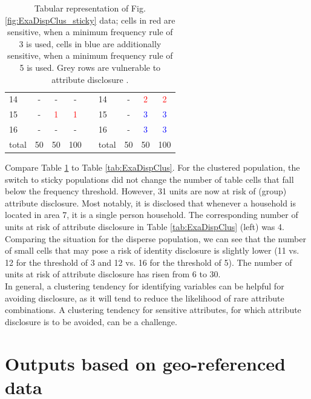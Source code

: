 \begin{table}[H]
\begin{tabular}{|l|cc|c|  c  |l|cc|c|}
        14 & -  & -  & -  &  & 14 & \cellcolor{lgrey}-  & \cellcolor{lgrey}\textcolor{red}{2} & \cellcolor{lgrey}\textcolor{red}{2}  \\
        15 & \cellcolor{lgrey}-  & \cellcolor{lgrey}\textcolor{red}{1}  & \cellcolor{lgrey}\textcolor{red}{1}  &  & 15 & \cellcolor{lgrey}-  & \cellcolor{lgrey}\textcolor{blue}{3} & \cellcolor{lgrey}\textcolor{blue}{3}  \\
        16 & -  & -  & -  &  & 16 & \cellcolor{lgrey}-  & \cellcolor{lgrey}\textcolor{blue}{3} & \cellcolor{lgrey}\textcolor{blue}{3}  \\
        \cline{1-4} \cline{6-9}
        \cline{1-4} \cline{6-9}
        total & 50 & 50 & 100 & & total & 50 & 50 & 100\\ 
        \cline{1-4} \cline{6-9}
    \end{tabular}
    \caption{Tabular representation of Fig. \ref{fig:ExaDispClus_sticky} data; cells in red are sensitive, when a minimum frequency rule of 3 is used, cells in blue are additionally sensitive, when a minimum frequency rule of 5 is used. Grey rows are vulnerable to attribute disclosure \citep[5.2]{HundepoolEtAl2024}.}
    \label{tab:ExaDispClus_sticky}
\end{table}

Compare Table \ref{tab:ExaDispClus_sticky} to Table \ref{tab:ExaDispClus}. For the clustered population, the switch to sticky populations did not change the number of table cells that fall below the frequency threshold. However, 31 units are now at risk of (group) attribute disclosure. Most notably, it is disclosed that whenever a household is located in area 7, it is a single person household. The corresponding number of units at risk of attribute disclosure in Table \ref{tab:ExaDispClus} (left) was 4.
Comparing the situation for the disperse population, we can see that the number of small cells that may pose a risk of identity disclosure is slightly lower (11 vs. 12 for the threshold of 3 and 12 vs. 16 for the threshold of 5). The number of units at risk of attribute disclosure has risen from 6 to 30.\\

In general, a clustering tendency for identifying variables can be helpful for avoiding disclosure, as it will tend to reduce the likelihood of rare attribute combinations. A clustering tendency for sensitive attributes, for which attribute disclosure is to be avoided, can be a challenge.

\section{Outputs based on geo-referenced data}

